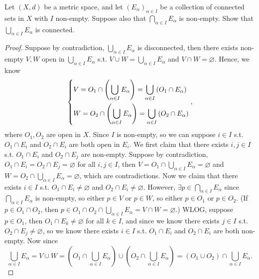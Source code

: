 \begin{problem}[15pts]
    Let $(X,d)$ be a metric space, and let $(E_\alpha)_{\alpha\in I}$ be a collection of connected sets in $X$ with $I$ non-empty.  
Suppose also that $\bigcap_{\alpha\in I} E_\alpha$ is non-empty.  
Show that $\bigcup_{\alpha\in I} E_\alpha$ is connected.
\end{problem}
\begin{proof}
    Suppose by contradiction, \(\bigcup_{\alpha \in I} E_\alpha  \) is disconnected, then there exists non-empty \(V, W\) open in \(\bigcup_{\alpha \in I} E_\alpha  \) s.t. \(V \cup W = \bigcup_{\alpha \in I} E_\alpha  \) and \(V \cap W = \varnothing \). Hence, we know 
    \[
        \begin{dcases}
            V = O_1 \cap \left( \bigcup_{\alpha \in I} E_\alpha   \right) = \bigcup_{\alpha \in I} \left( O_1 \cap E_\alpha  \right) \\
            W = O_2 \cap \left( \bigcup_{\alpha \in I} E_\alpha   \right) = \bigcup_{\alpha \in I} \left( O_2 \cap E_\alpha  \right)  
        \end{dcases},
    \] where \(O_1, O_2\) are open in \(X\). Since \(I\) is non-empty, so we can suppose \(i \in I\) s.t. \(O_1 \cap E_i\) and \(O_2 \cap E_i\) are both open in \(E_i\). We first claim that there exists \(i, j \in I\) s.t. \(O_1 \cap E_i\) and \(O_2 \cap E_j\) are non-empty. Suppose by contradiction, \(O_1 \cap E_i = O_2 \cap E_j = \varnothing \) for all \(i, j \in I\), then \(V = O_1 \cap \bigcup_{\alpha \in I} E_\alpha  = \varnothing  \) and \(W = O_2 \cap \bigcup_{\alpha \in I} E_\alpha = \varnothing  \), which are contradictions. Now we claim that there exists \(i \in I\) s.t. \(O_1 \cap E_i \neq \varnothing \) and \(O_2 \cap E_i \neq \varnothing \).
    However, \(\exists p \in \bigcap_{\alpha \in I} E_\alpha \) since \(\bigcap_{\alpha \in I} E_\alpha\) is non-empty, so either \(p \in V\) or \(p \in W\), so either \(p \in O_1\) or \(p \in O_2\). (If \(p \in O_1 \cap O_2\), then \(p \in O_1 \cap O_2 \cap \bigcup_{\alpha \in I} E_\alpha  = V \cap W = \varnothing \).) WLOG, suppose \(p \in O_1\), then \(O_1 \cap E_k \neq \varnothing \) for all \(k \in I\), and since we know there exists \(j \in I\) s.t. \(O_2 \cap E_j \neq \varnothing \), so we know there exists \(i \in I\) s.t. \(O_1 \cap E_i\) and \(O_2 \cap E_i\) are both non-empty.           
    Now since 
    \[
        \bigcup_{\alpha \in I} E_\alpha = V \cup W = \left( O_1 \cap \bigcup_{\alpha \in I} E_\alpha \right) \cup \left( O_2 \cap \bigcup_{\alpha \in I} E_\alpha \right) = (O_1 \cup O_2) \cap \bigcup_{\alpha \in I} E_\alpha.  
\]
\end{proof}
